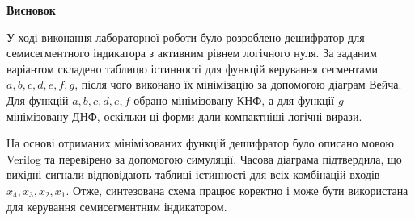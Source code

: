 \documentclass[12pt,a4paper]{article}
\begin{document}
    \begin{center} \textbf{\Large Висновок} \end{center}

    У ході виконання лабораторної роботи було розроблено дешифратор для семисегментного індикатора з активним рівнем логічного нуля. За заданим варіантом складено таблицю істинності для функцій керування сегментами $a, b, c, d, e, f, g$, після чого виконано їх мінімізацію за допомогою діаграм Вейча. Для функцій $a, b, c, d, e, f$ обрано мінімізовану КНФ, а для функції $g$ -- мінімізовану ДНФ, оскільки ці форми дали компактніші логічні вирази.

    На основі отриманих мінімізованих функцій дешифратор було описано мовою Verilog та перевірено за допомогою симуляції. Часова діаграма підтвердила, що вихідні сигнали відповідають таблиці істинності для всіх комбінацій входів $x_4, x_3, x_2, x_1$. Отже, синтезована схема працює коректно і може бути використана для керування семисегментним індикатором.
\end{document}
